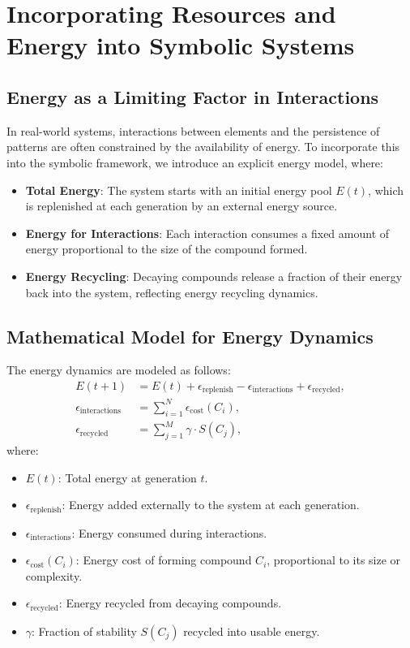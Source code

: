 \documentclass[entropy,article,submit,pdftex,moreauthors]{Definitions/mdpi}
\begin{document}
\section{Incorporating Resources and Energy into Symbolic Systems}

\subsection{Energy as a Limiting Factor in Interactions}

In real-world systems, interactions between elements and the persistence of patterns are often constrained by the availability of energy. To incorporate this into the symbolic framework, we introduce an explicit energy model, where:
\begin{itemize}
    \item \textbf{Total Energy}: The system starts with an initial energy pool \( E(t) \), which is replenished at each generation by an external energy source.
    \item \textbf{Energy for Interactions}: Each interaction consumes a fixed amount of energy proportional to the size of the compound formed.
    \item \textbf{Energy Recycling}: Decaying compounds release a fraction of their energy back into the system, reflecting energy recycling dynamics.
\end{itemize}

\subsection{Mathematical Model for Energy Dynamics}

The energy dynamics are modeled as follows:
\begin{align}
E(t+1) &= E(t) + \epsilon_{\text{replenish}} - \epsilon_{\text{interactions}} + \epsilon_{\text{recycled}}, \\
\epsilon_{\text{interactions}} &= \sum_{i=1}^{N} \epsilon_{\text{cost}}(C_i), \\
\epsilon_{\text{recycled}} &= \sum_{j=1}^{M} \gamma \cdot S(C_j),
\end{align}
where:
\begin{itemize}
    \item \( E(t) \): Total energy at generation \( t \).
    \item \( \epsilon_{\text{replenish}} \): Energy added externally to the system at each generation.
    \item \( \epsilon_{\text{interactions}} \): Energy consumed during interactions.
    \item \( \epsilon_{\text{cost}}(C_i) \): Energy cost of forming compound \( C_i \), proportional to its size or complexity.
    \item \( \epsilon_{\text{recycled}} \): Energy recycled from decaying compounds.
    \item \( \gamma \): Fraction of stability \( S(C_j) \) recycled into usable energy.
\end{itemize}
\end{document}
